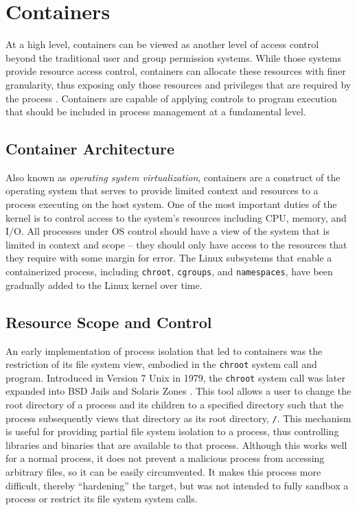 \section{Containers}
\label{sec:containers}
At a high level, containers can be viewed as another level of access control beyond the traditional user and group permission systems. 
While those systems provide resource access control, containers can allocate these resources with finer granularity, thus exposing only those resources and privileges that are required by the process \autocite{_felter_1}. 
Containers are capable of applying controls to program execution that should be included in process management at a fundamental level.

\subsection{Container Architecture}
\label{sec:containerarchitecture}
Also known as \emph{operating system virtualization}, containers are a construct of the operating system that serves to provide limited context and resources to a process executing on the host system. 
One of the most important duties of the kernel is to control access to the system's resources including CPU, memory, and I/O.  
All processes under OS control should have a view of the system that is limited in context and scope -- they should only have access to the resources that they require with some margin for error.  
The Linux subsystems that enable a containerized process, including \texttt{chroot}, \texttt{cgroups}, and \texttt{namespaces}, have been gradually added to the Linux kernel over time.

\subsection{Resource Scope and Control}
\label{sec:resource_scope_control}
An early implementation of process isolation that led to containers was the restriction of its file system view, embodied in the \texttt{chroot} system call and program. 
Introduced in Version 7 Unix in 1979, the \texttt{chroot} system call was later expanded into BSD Jails and Solaris Zones \autocite{_zones_1}.
This tool allows a user to change the root directory of a process and its children to a specified directory such that the process subsequently views that directory as its root directory, \texttt{/}.  
This mechanism is useful for providing partial file system isolation to a process, thus controlling libraries and binaries that are available to that process.
Although this works well for a normal process, it does not prevent a malicious process from accessing arbitrary files, so it can be easily circumvented.
It makes this process more difficult, thereby ``hardening'' the target, but was not intended to fully sandbox a process or restrict its file system system calls.

